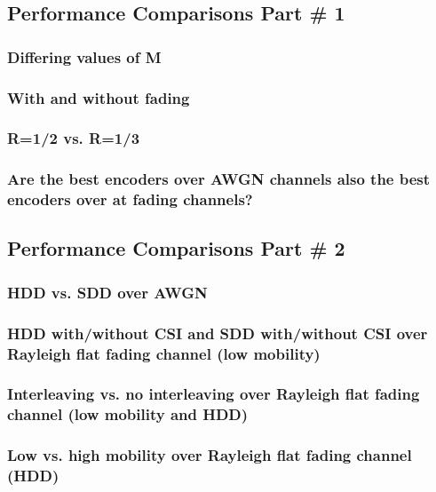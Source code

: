 \documentclass[a4paper,10pt]{article}
\begin{document}
\subsection{Performance Comparisons Part \# 1}

\subsubsection{Differing values of M}

\subsubsection{With and without fading}

\subsubsection{R=1/2 vs. R=1/3}

\subsubsection{Are the best encoders over AWGN channels also the best encoders over at fading
channels?}


\subsection{Performance Comparisons Part \# 2}

\subsubsection{HDD vs. SDD over AWGN}

\subsubsection{HDD with/without CSI and SDD with/without CSI over Rayleigh flat fading channel (low mobility)}

\subsubsection{Interleaving vs. no interleaving over Rayleigh flat fading channel (low mobility and HDD)}

\subsubsection{Low vs. high mobility over Rayleigh flat fading channel (HDD)}


\end{document}
